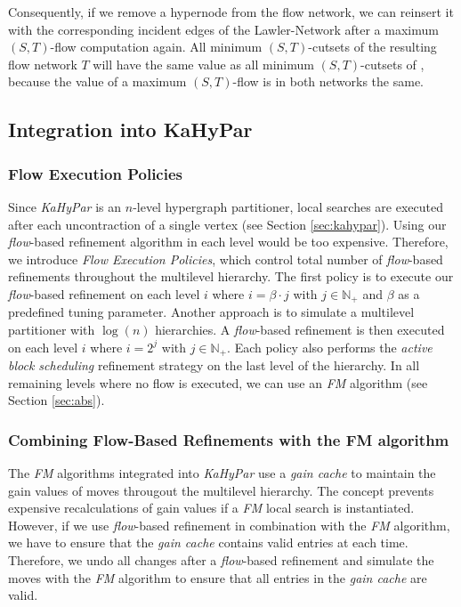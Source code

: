 Consequently, if we remove a hypernode from the flow network, we can reinsert it with the
corresponding incident edges of the Lawler-Network after a maximum $(S,T)$-flow computation again.
All minimum $(S,T)$-cutsets of the resulting flow network $T$ will have the same value as all minimum
$(S,T)$-cutsets of , because the value of a maximum $(S,T)$-flow is in both networks
the same.


\subsection{Integration into KaHyPar}
\label{sec:integration_kahypar}  

\subsubsection*{Flow Execution Policies}
Since \emph{KaHyPar} is an $n$-level hypergraph partitioner, local searches
are executed after each uncontraction of a single vertex (see Section \ref{sec:kahypar}). 
Using our \emph{flow}-based refinement algorithm in each level would be too expensive.
Therefore, we introduce \emph{Flow Execution Policies}, which control total number of
\emph{flow}-based refinements throughout the multilevel hierarchy. The first policy is to 
execute our \emph{flow}-based refinement on each level $i$ where $i = \beta\cdot j$ with 
$j \in \mathbb{N}_+$ and $\beta$ as a predefined tuning parameter. Another approach is to simulate a
multilevel partitioner with $\log(n)$ hierarchies. A \emph{flow}-based refinement is then
executed on each level $i$ where $i = 2^j$ with $j \in \mathbb{N}_+$. Each policy also
performs the \emph{active block scheduling} refinement strategy on the last level of the
hierarchy. In all remaining levels where no flow is executed, we can use an 
\emph{FM} algorithm 
\cite{akhremtsev2017engineering,fiduccia1988linear,sanchis1989multiple} (see Section 
\ref{sec:abs}). 

\subsubsection*{Combining Flow-Based Refinements with the FM algorithm}
The \emph{FM} algorithms integrated into \emph{KaHyPar} use a \emph{gain cache} to maintain
the gain values of moves througout the multilevel hierarchy. The concept prevents expensive recalculations
of gain values if a \emph{FM} local search is instantiated. However, if we use \emph{flow}-based
refinement in combination with the \emph{FM} algorithm, we have to ensure that the 
\emph{gain cache} contains valid entries at each time. Therefore, we undo all changes after a \emph{flow}-based
refinement and simulate the moves with the \emph{FM} algorithm to ensure that all entries in
the \emph{gain cache} are valid.

